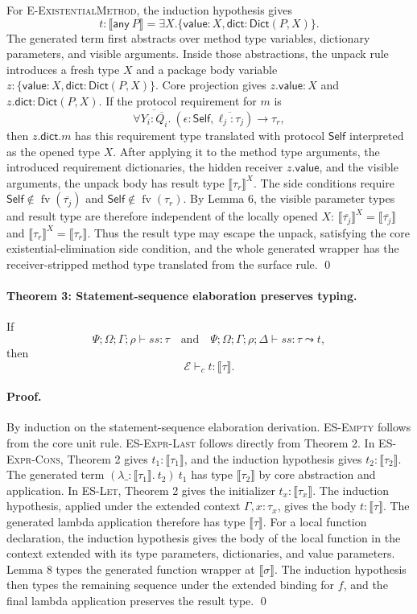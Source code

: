 \documentclass[manuscript,nonacm]{acmart}
\newcommand{\kw}[1]{\ensuremath{\mathsf{#1}}}
\newcommand{\Self}{\kw{Self}\xspace}
\newcommand{\Any}[1]{\kw{any}\ #1}
\newcommand{\fv}{\operatorname{fv}}
\newcommand{\ftype}[3]{\forall #1.\ (#2) \to #3}
\newcommand{\has}{\vdash}
\newcommand{\elab}{\leadsto}
\newcommand{\trans}[1]{\llbracket #1 \rrbracket}
\newcommand{\transSelf}[2]{\llbracket #2 \rrbracket^{#1}}
\newcommand{\Dict}{\mathsf{Dict}}
\begin{document}
For \textsc{E-ExistentialMethod}, the induction hypothesis gives
\[
  t:\trans{\Any{P}}
   =\exists X.\{\kw{value}:X,\kw{dict}:\Dict(P,X)\}.
\]
The generated term first abstracts over method type variables, dictionary parameters, and visible arguments.
Inside those abstractions, the unpack rule introduces a fresh type $X$ and a package body variable
$z:\{\kw{value}:X,\kw{dict}:\Dict(P,X)\}$.
Core projection gives $z.\kw{value}:X$ and
$z.\kw{dict}:\Dict(P,X)$.
If the protocol requirement for $m$ is
\[
  \ftype{\overline{Y_i:\overline{Q_i}}}
         {\epsilon:\Self,\overline{\ell_j:\tau_j}}
         {\tau_r},
\]
then $z.\kw{dict}.m$ has this requirement type translated with protocol \Self interpreted as the opened type $X$.
After applying it to the method type arguments, the introduced requirement dictionaries, the hidden receiver $z.\kw{value}$, and the visible arguments, the unpack body has result type $\transSelf{X}{\tau_r}$.
The side conditions require
$\Self\notin\fv(\overline{\tau_j})$ and $\Self\notin\fv(\tau_r)$.
By Lemma 6, the visible parameter types and result type are therefore independent of the locally opened $X$:
$\transSelf{X}{\overline{\tau_j}}=\trans{\overline{\tau_j}}$ and
$\transSelf{X}{\tau_r}=\trans{\tau_r}$.
Thus the result type may escape the unpack, satisfying the core existential-elimination side condition, and the whole generated wrapper has the receiver-stripped method type translated from the surface rule.
\qed

\paragraph{Theorem 3: Statement-sequence elaboration preserves typing.}
If
\[
  \Psi;\Omega;\Gamma;\rho\has ss:\tau
  \quad\text{and}\quad
  \Psi;\Omega;\Gamma;\rho;\Delta\has ss:\tau\elab t,
\]
then
\[
  \mathcal{E}\has_c t:\trans{\tau}.
\]

\paragraph{Proof.}
By induction on the statement-sequence elaboration derivation.
\textsc{ES-Empty} follows from the core unit rule.
\textsc{ES-Expr-Last} follows directly from Theorem 2.
In \textsc{ES-Expr-Cons}, Theorem 2 gives $t_1:\trans{\tau_1}$, and the induction hypothesis gives $t_2:\trans{\tau_2}$.
The generated term $(\lambda\_:\trans{\tau_1}.\ t_2)\ t_1$ has type $\trans{\tau_2}$ by core abstraction and application.
In \textsc{ES-Let}, Theorem 2 gives the initializer $t_x:\trans{\tau_x}$.
The induction hypothesis, applied under the extended context $\Gamma,x:\tau_x$, gives the body $t:\trans{\tau}$.
The generated lambda application therefore has type $\trans{\tau}$.
For a local function declaration, the induction hypothesis gives the body of the local function in the context extended with its type parameters, dictionaries, and value parameters.
Lemma 8 types the generated function wrapper at $\trans{\sigma}$.
The induction hypothesis then types the remaining sequence under the extended binding for $f$, and the final lambda application preserves the result type.
\qed
\end{document}

